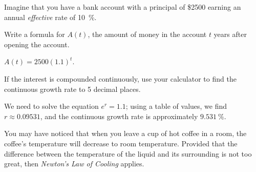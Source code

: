 \begin{exercises}
\begin{problem}
\begin{shortsolution}
\end{shortsolution}
\end{problem}
\begin{problem}
Imagine that you have a bank account with a principal of \$2500 earning an 
annual \emph{effective} rate of \SI{10}{\percent}.
\begin{subproblem}
	Write a formula for $A(t)$, the amount of money in the account $t$ years 
	after opening the account.
	\begin{shortsolution}
		$A(t)=2500(1.1)^t$.
	\end{shortsolution}
\end{subproblem}
\begin{subproblem}
	If the interest is compounded continuously, use your calculator to find the 
	continuous growth rate to 5 decimal places.
	\begin{shortsolution}
		We need to solve the equation $e^r=1.1$; using a table of values, we 
		find $r\approx 0.09531$, and the continuous growth rate is 
		approximately $\SI{9.531}{\percent}$.
	\end{shortsolution}
\end{subproblem}
\end{problem}
\begin{problem}
You may have noticed that when you leave a cup of hot coffee in a room, 
the coffee's temperature will decrease to room temperature. Provided that 
the difference between the temperature of the liquid and its surrounding 
is not too great, then \emph{Newton's Law of Cooling} applies.
			

\end{problem}
\end{exercises}
